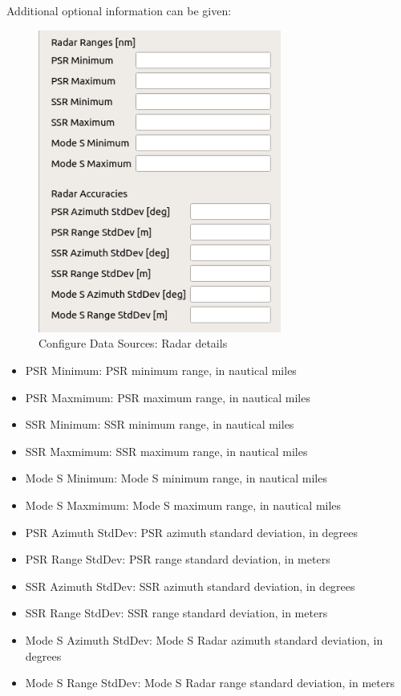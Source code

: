 Additional optional information can be given:

\begin{figure}[H]
  \center
    \includegraphics[width=8cm,frame]{figures/configure_data_sources_radar_details.png}
  \caption{Configure Data Sources: Radar details}
\end{figure}

\begin{itemize}
\item PSR Minimum: PSR minimum range, in nautical miles
\item PSR Maxmimum: PSR maximum range, in nautical miles
\item SSR Minimum: SSR minimum range, in nautical miles
\item SSR Maxmimum: SSR maximum range, in nautical miles
\item Mode S Minimum: Mode S minimum range, in nautical miles
\item Mode S Maxmimum: Mode S maximum range, in nautical miles
\item PSR Azimuth StdDev: PSR azimuth standard deviation, in degrees
\item PSR Range StdDev: PSR range standard deviation, in meters
\item SSR Azimuth StdDev: SSR azimuth standard deviation, in degrees
\item SSR Range StdDev: SSR range standard deviation, in meters
\item Mode S Azimuth StdDev: Mode S Radar azimuth standard deviation, in degrees
\item Mode S Range StdDev: Mode S Radar range standard deviation, in meters
\end{itemize}
\ \\

